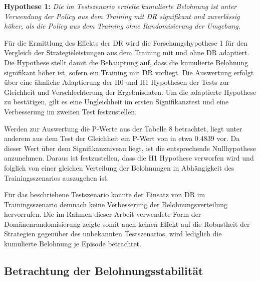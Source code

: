 \textbf{Hypothese 1:}
\textit{Die im Testszenario erzielte kumulierte Belohnung ist unter Verwendung der Policy aus dem Training mit DR signifikant und zuverlässig höher, als die Policy aus dem Training ohne Randomisierung der Umgebung.}

Für die Ermittlung des Effekts der DR wird die Forschungshypothese 1 für den Vergleich der Strategieleistungen aus dem Training mit und ohne DR adaptiert.
Die Hypothese stellt damit die Behauptung auf, dass die kumulierte Belohnung signifikant höher ist, sofern ein Training mit DR vorliegt.
Die Auswertung erfolgt über eine ähnliche Adaptierung der H0 und H1 Hypothesen der Tests zur Gleichheit und Verschlechterung der Ergebnisdaten.
Um die adaptierte Hypothese zu bestätigen, gilt es eine Ungleichheit im ersten Signifikanztest und eine Verbesserung im zweiten Test festzustellen.

Werden zur Auswertung die P-Werte aus der Tabelle 8 betrachtet, liegt unter anderem aus dem Test der Gleichheit ein P-Wert von in etwa $0.4839$ vor.
Da dieser Wert über dem Signifikanzniveau liegt, ist die entsprechende Nullhypothese anzunehmen.
Daraus ist festzustellen, dass die H1 Hypothese verworfen wird und folglich von einer gleichen Verteilung der Belohnungen in Abhängigkeit des Trainingsszenarios auszugehen ist.

Für das beschriebene Testszenario konnte der Einsatz von DR im Trainingsszenario demnach keine Verbesserung der Belohnungsverteilung hervorrufen.
Die im Rahmen dieser Arbeit verwendete Form der Domänenrandomisierung zeigte somit auch keinen Effekt auf die Robustheit der Strategien gegenüber des unbekannten Testszenarios, wird lediglich die kumulierte Belohnung je Episode betrachtet.

\subsection{Betrachtung der Belohnungsstabilität}

